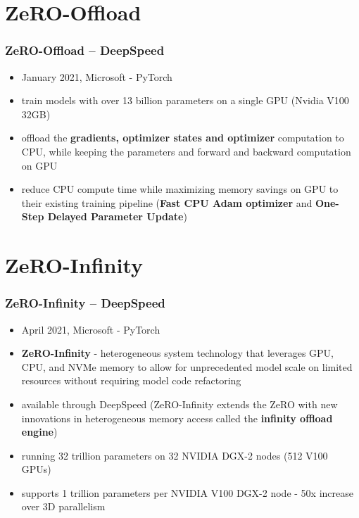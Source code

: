 \documentclass{beamer}
\begin{document}
\section{ZeRO-Offload}
\begin{frame}
    \frametitle{ZeRO-Offload \cite{zero_offload} -- DeepSpeed}
    \begin{itemize}
        \item January 2021, Microsoft - PyTorch
        \item train models with over 13 billion parameters on a single GPU (Nvidia V100 32GB)
        \item offload the \textbf{gradients, optimizer states and optimizer} computation to CPU, while keeping the parameters and
forward and backward computation on GPU
        \item reduce CPU compute time while maximizing memory savings on GPU to their existing training pipeline (\textbf{Fast CPU Adam optimizer} and \textbf{One-Step Delayed Parameter Update})
    \end{itemize}
\end{frame}

\section{ZeRO-Infinity}
\begin{frame}
    \frametitle{ZeRO-Infinity \cite{zero_infinity} -- DeepSpeed}
    \begin{itemize}
        \item April 2021, Microsoft - PyTorch
        \item \textbf{ZeRO-Infinity} - heterogeneous system technology that leverages GPU, CPU, and NVMe memory to allow for unprecedented model scale on limited resources without requiring model code refactoring
        \item available through DeepSpeed (ZeRO-Infinity extends the ZeRO with new innovations in heterogeneous memory access called the \textbf{infinity offload engine})
        \item running 32 trillion parameters on 32 NVIDIA DGX-2 nodes (512 V100 GPUs)
        \item supports 1 trillion parameters per NVIDIA V100 DGX-2 node - 50x increase over 3D parallelism
    \end{itemize}
\end{frame}

\end{document}
